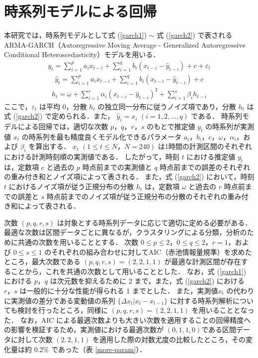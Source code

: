 \documentclass[technicalreport]{ieicej}
\begin{document}
\section{時系列モデルによる回帰}
本研究では，時系列モデルとして式 (\ref{garch1}) $\sim$ 式 (\ref{garch2}) で表される ARMA-GARCH（Autoregressive Moving Average - Generalized Autoregressive Conditional Heteroscedasticity）モデル\cite{lamoureux1990persistence}を用いる．
\begin{eqnarray}
y_t = \sum_{i=1}^p a_i x_{t-i} + \sum_{i=1}^q b_i (x_{t-i} - \widehat{y}_{t-i}) + c + \varepsilon_{t} 
\label{garch1}
\end{eqnarray}
\begin{eqnarray}
\widehat{y}_t = \sum_{i=1}^p a_i x_{t-i} + \sum_{i=1}^q b_i (x_{t-i} - \widehat{y}_{t-i}) + c
\end{eqnarray}
\begin{eqnarray}
\displaystyle h_{t} = \omega + \sum_{i=1}^{r}\alpha_i(x_{t-i} - \widehat{y}_{t-i})^2 + \sum_{i=1}^{s}\beta_ih_{t-i}
\label{garch2}
\end{eqnarray}
ここで，$\varepsilon_t$ は平均 0，分散 $h_t$ の独立同一分布に従うノイズ項であり，分散 $h_t$ は式 (\ref{garch2}) で定められる．また， $\widehat{y}_i = x_i$ $(i = 1,2,\ldots,q)$ である．
時系列モデルによる回帰では，適切な次数 $p，q，r，s$ のもとで推定値 $y_t$ の時系列が実測値 $x_t$ の時系列を最も精度良くモデル化できるパラメータ $a_i，b_i，c，\omega，\alpha_i，$および $\beta_i$ を算出する．
$x_t$ $(1\leq t\leq N，N=240)$ は1時間の計測区間のそれぞれにおける計測時刻順の実測値である．
したがって，時刻 $t$ における推定値 $y_t$ は，定数項 $c$ と過去の $p$ 時点前までの実測値と $q$ 時点前までの誤差のそれぞれの重み付き和とノイズ項によって表される．
また，式 (\ref{garch2}) において，時刻 $t$ におけるノイズ項が従う正規分布の分散 $h_t$ は，定数項 $\omega$ と過去の $r$ 時点前までの誤差と $s$ 時点前までのノイズ項が従う正規分布の分散のそれぞれの重み付き和によって表される．

次数 $(p,q,r,s)$ は対象とする時系列データに応じて適切に定める必要がある．
最適な次数は区間データごとに異なるが，クラスタリングによる分類，分析のために共通の次数を用いることとする．
次数 $0\leq p\leq2，0\leq q\leq 2，r=1$，および $0\leq s\leq 1$ のそれぞれの組み合わせに対してAIC（赤池情報量規準）\cite{bozdogan1987model}\cite{burnham2004multimodel}を求めたところ，最大次数である $(p,q,r,s)=(2,2,1,1)$ が最適な計測区間が存在することから，これを共通の次数として用いることとした．
なお，式 (\ref{garch1}) における $p，q$ は次元数を抑えるために 2 まで，また，式 (\ref{garch2}) における $r，s$ は一般的に十分な性能が得られる 1 までとした\cite{hansen2005forecast}．
また，実測値$ x_t$ の代わりに実測値の差分である変動値の系列 $\{\Delta x_t | x_t - x_{t-1} \}$ に対する時系列解析についても検討を行ったところ，同様に $(p,q,r,s)=(2,2,1,1)$ を用いることとなった．
なお，AIC による最適次数よりも大きい次数を適用することの回帰精度への影響を検証するため，実測値における最適次数が $(0,1,1,0) $である区間データに対して次数 $(2,2,1,1)$ を適用した際の対数尤度の比較したところ，その変化量は約 0.2\% であった（表 \ref{more-param}）．
\end{document}
